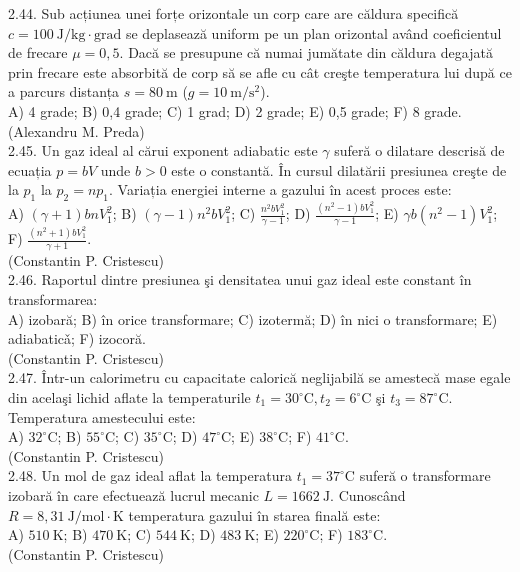 2.44. Sub acțiunea unei forțe orizontale un corp care are căldura specifică $c=100 \mathrm{~J} / \mathrm{kg} \cdot \mathrm{grad}$ se deplasează uniform pe un plan orizontal având coeficientul de frecare $\mu=0,5$. Dacă se presupune că numai jumătate din căldura degajată prin frecare este absorbită de corp să se afle cu cât creşte temperatura lui după ce a parcurs distanța $s=80 \mathrm{~m}$ ($g=10 \mathrm{~m} / \mathrm{s}^{2}$).\\ A) 4 grade; B) 0,4 grade; C) 1 grad; D) 2 grade; E) 0,5 grade; F) 8 grade.\\ (Alexandru M. Preda)\\

2.45. Un gaz ideal al cărui exponent adiabatic este $\gamma$ suferă o dilatare descrisă de ecuația $p=b V$ unde $b>0$ este o constantă. În cursul dilatării presiunea creşte de la $p_{1}$ la $p_{2}=n p_{1}$. Variația energiei interne a gazului în acest proces este:\\ A) $(\gamma+1) b n V_{1}^{2}$; B) $(\gamma-1) n^{2} b V_{1}^{2}$; C) $\frac{n^{2} b V_{1}^{2}}{\gamma-1}$; D) $\frac{\left(n^{2}-1\right) b V_{1}^{2}}{\gamma-1}$; E) $\gamma b\left(n^{2}-1\right) V_{1}^{2}$; F) $\frac{\left(n^{2}+1\right) b V_{1}^{2}}{\gamma+1}$.\\ (Constantin P. Cristescu)\\

2.46. Raportul dintre presiunea şi densitatea unui gaz ideal este constant în transformarea:\\ A) izobară; B) în orice transformare; C) izotermă; D) în nici o transformare; E) adiabaticǎ; F) izocoră.\\ (Constantin P. Cristescu)\\

2.47. Într-un calorimetru cu capacitate calorică neglijabilă se amestecă mase egale din acelaşi lichid aflate la temperaturile $t_{1}=30^{\circ} \mathrm{C}, t_{2}=6^{\circ} \mathrm{C}$ şi $t_{3}=87^{\circ} \mathrm{C}$. Temperatura amestecului este:\\ A) $32^{\circ} \mathrm{C}$; B) $55^{\circ} \mathrm{C}$; C) $35^{\circ} \mathrm{C}$; D) $47^{\circ} \mathrm{C}$; E) $38^{\circ} \mathrm{C}$; F) $41^{\circ} \mathrm{C}$.\\ (Constantin P. Cristescu)\\

2.48. Un mol de gaz ideal aflat la temperatura $t_{1}=37^{\circ} \mathrm{C}$ suferă o transformare izobară în care efectuează lucrul mecanic $L=1662 \mathrm{~J}$. Cunoscând $R=8,31 \mathrm{~J} / \mathrm{mol} \cdot \mathrm{K}$ temperatura gazului în starea finală este:\\ A) $510 \mathrm{~K}$; B) $470 \mathrm{~K}$; C) $544 \mathrm{~K}$; D) $483 \mathrm{~K}$; E) $220^{\circ} \mathrm{C}$; F) $183^{\circ} \mathrm{C}$.\\ (Constantin P. Cristescu)\\

